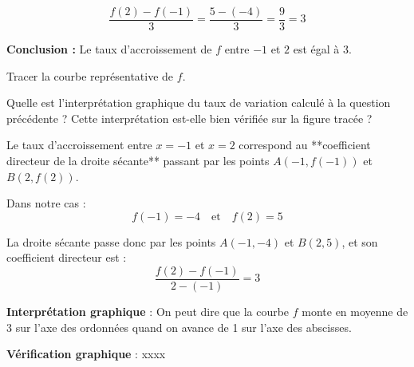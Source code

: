 \documentclass[answers]{exam}
\begin{document}
\begin{questions}
\begin{solution}
  \[
  \frac{f(2) - f(-1)}{3} = \frac{5 - (-4)}{3} = \frac{9}{3} = 3
  \]
  
  \textbf{Conclusion :} Le taux d'accroissement de $f$ entre $-1$ et $2$ est égal à $3$.
  \end{solution}
\question[1.5] Tracer la courbe représentative de $f$.

\question[1] Quelle est l’interprétation graphique du taux de variation calculé à la question précédente ? Cette interprétation est-elle bien vérifiée sur la figure tracée ?
\begin{solution}
  Le taux d'accroissement entre $x = -1$ et $x = 2$ correspond au **coefficient directeur de la droite sécante** passant par les points $A(-1, f(-1))$ et $B(2, f(2))$.
  
  Dans notre cas :
  \[
  f(-1) = -4 \quad \text{et} \quad f(2) = 5
  \]
  
  La droite sécante passe donc par les points $A(-1, -4)$ et $B(2, 5)$, et son coefficient directeur est :
  \[
  \frac{f(2) - f(-1)}{2 - (-1)} = 3
  \]
  
  \textbf{Interprétation graphique} :  
  On peut dire que la courbe $f$ monte en moyenne de 3 sur l'axe des ordonnées quand on avance de 1 sur l'axe des abscisses. 
  
  \textbf{Vérification graphique} :   
  xxxx
  
  \end{solution}
\end{questions}
\end{document}
